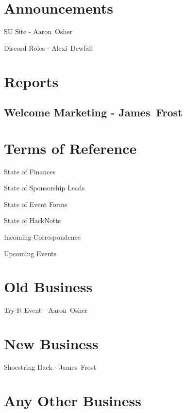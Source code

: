 \documentclass[11pt,hacksoc,agenda]{meetingmins}
\begin{document}
\maketitle

\section{Announcements}
\begin{items}
  \item {SU Site - Aaron~Osher}
  \item {Discord Roles - Alexi~Dewfall}
\end{items}

\section{Reports}
\subsection{Welcome Marketing - James~Frost}
\begin{hiddensubitems}
\item {}
\end{hiddensubitems}

\section{Terms of Reference}
\begin{items}
\item {State of Finances}
\item {State of Sponsorship Leads}
\item {State of Event Forms}
\item {State of HackNotts}
\item {Incoming Correspondence}
\item {Upcoming Events}
\end{items}

\section{Old Business}
\begin{items}
\item {Try-It Event - Aaron~Osher}
\end{items}

\section{New Business}
\begin{items}
\item {Shoestring Hack - James~Frost}
\end{items}

\section{Any Other Business}

\vspace{1em}
\nextmeeting{}
\end{document}
